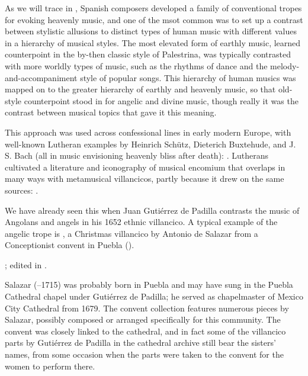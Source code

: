 
As we will trace in , Spanish composers developed a
family of conventional tropes for evoking heavenly music, and one of the msot
common was to set up a contrast between stylistic allusions to distinct types
of human music with different values in a hierarchy of musical styles.
The most elevated form of earthly music, learned counterpoint in the by-then
classic style of Palestrina, was typically contrasted with more worldly types
of music, such as the rhythms of dance and the melody-and-accompaniment style
of popular songs.
This hierarchy of human musics was mapped on to the greater hierarchy of
earthly and heavenly music, so that old-style counterpoint stood in for
angelic and divine music, though really it was the contrast between musical
topics that gave it this meaning.%
\begin{Footnote}
    This approach was used across confessional lines in early modern Europe,
    with well-known Lutheran examples by Heinrich Schütz, Dieterich Buxtehude,
    and J. S. Bach (all in music envisioning heavenly bliss after death):
    \autocites
    {Johnston:Rhetorical}
    {Yearsley:Buxtehude}
    {Yearsley:BachCounterpoint}.
    Lutherans cultivated a literature and iconography of musical encomium that
    overlaps in many ways with metamusical villancicos, partly because it drew
    on the same sources:
    \autocite{Schmidt:Lob_der_Musik}.
\end{Footnote}
We have already seen this when Juan Gutiérrez de Padilla contrasts the music of
Angolans and angels in his 1652 ethnic villancico.
A typical example of the angelic trope is , a Christmas villancico by Antonio de Salazar from a Conceptionist
convent in Puebla ().%
\begin{Footnote} 
    ; edited in \autocite{Cashner:WLSCM32}.  
\end{Footnote}
Salazar (--1715) was probably born in Puebla and may have sung in
the Puebla Cathedral chapel under Gutiérrez de Padilla; he served as
chapelmaster of Mexico City Cathedral from 1679.%
    \Autocite{Koegel:Salazar} 
The convent collection features numerous pieces by Salazar, possibly composed
or arranged specifically for this community.
The convent was closely linked to the cathedral, and in fact some of the
villancico parts by Gutiérrez de Padilla in the cathedral archive still bear
the sisters' names, from some occasion when the parts were taken to the convent
for the women to perform there.%
    \Autocites
    {Favila:Profession}
    {Tello:SanchezGarzaCatalogo}

